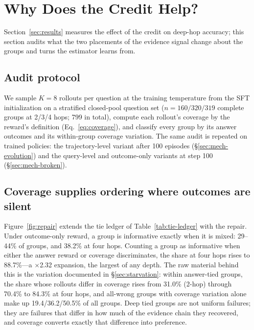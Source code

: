
\section{Why Does the Credit Help?}
\label{sec:mechanism}

Section~\ref{sec:results} measures the effect of the credit on
deep-hop accuracy; this section audits what the two placements of the
evidence signal change about the groups and turns the estimator learns
from.

\subsection{Audit protocol}
\label{sec:mech-protocol}

We sample $K{=}8$ rollouts per question at the training temperature
from the SFT initialization on a stratified closed-pool question set
($n{=}160/320/319$ complete groups at 2/3/4 hops; 799 in total),
compute each rollout's coverage by the reward's definition
(Eq.~\ref{eq:coverage}), and classify every group by its answer
outcomes and its within-group coverage variation. The same audit is
repeated on trained policies: the trajectory-level variant after 100
episodes (\S\ref{sec:mech-evolution}) and the query-level and
outcome-only variants at step 100 (\S\ref{sec:mech-broken}).

\subsection{Coverage supplies ordering where outcomes are silent}
\label{sec:mech-repair}

Figure~\ref{fig:repair} extends the tie ledger of
Table~\ref{tab:tie-ledger} with the repair. Under outcome-only reward,
a group is informative exactly when it is mixed: 29--44\% of groups,
and 38.2\% at four hops. Counting a group as informative when either
the answer reward or coverage discriminates, the share at four hops
rises to 88.7\%---a $\times$2.32 expansion, the largest of any depth.
The raw material behind this is the variation documented in
\S\ref{sec:starvation}: within answer-tied groups, the share whose
rollouts differ in coverage rises from 31.0\% (2-hop) through 70.4\% to
84.3\% at four hops, and all-wrong groups with coverage variation alone
make up 19.4/36.2/50.5\% of all groups. Deep tied groups are not
uniform failures; they are failures that differ in how much of the
evidence chain they recovered, and coverage converts exactly that
difference into preference.

